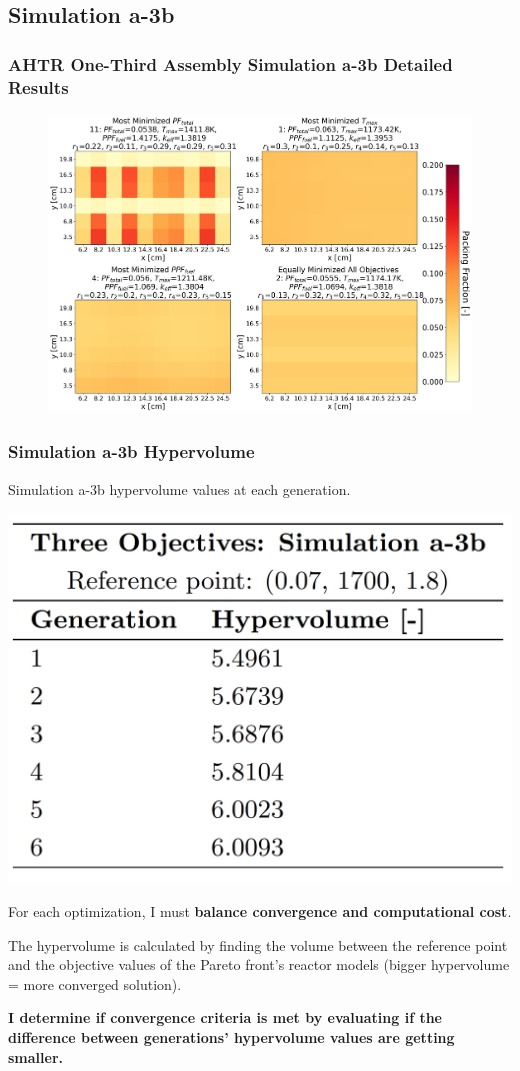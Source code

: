\subsection{Simulation a-3b}

\begin{frame}
    \frametitle{AHTR One-Third Assembly Simulation a-3b Detailed Results}
    \begin{figure}
        \includegraphics[width=0.8\linewidth]{../docs/figures/assem-obj-3-all-distr-most-minimized.png} 
    \end{figure}
\end{frame}

\begin{frame}
    \frametitle{Simulation a-3b Hypervolume}
    \begin{table}
        \caption{Simulation a-3b hypervolume values at each generation.}
        \includegraphics[width=0.35\linewidth]{figures/a-3b-hypervolume.png} 
    \end{table}

    For each optimization, I must \textbf{balance convergence and computational cost}.

    \vspace{0.1cm}
    The hypervolume is calculated by finding the volume between the reference point and 
    the objective values of the Pareto front's reactor models (bigger hypervolume = 
    more converged solution).

    \vspace{0.1cm}
    \textbf{I determine if convergence criteria is met by evaluating if the difference between 
    generations' hypervolume values are getting smaller.}
\end{frame}